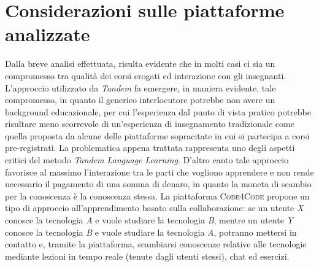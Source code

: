 \section{Considerazioni sulle piattaforme analizzate}
Dalla breve analisi effettuata, risulta evidente che in molti casi ci sia un compromesso tra qualità dei corsi erogati ed interazione con gli insegnanti. L'approccio utilizzato da \emph{Tandem} fa emergere, in maniera evidente, tale compromesso, in quanto il generico interlocutore potrebbe non avere un background educazionale, per cui l'esperienza dal punto di vista pratico potrebbe risultare meno scorrevole di un'esperienza di insegnamento tradizionale come quella proposta da alcune delle piattaforme sopracitate in cui si partecipa a corsi pre-registrati. La problematica appena trattata rappresenta uno degli aspetti critici del metodo \emph{Tandem Language Learning}. D'altro canto tale approccio favorisce al massimo l'interazione tra le parti che vogliono apprendere e non rende necessario il pagamento di una somma di denaro, in quanto la moneta di scambio per la conoscenza è la conoscenza stessa. La piattaforma \textsc{Code4Code} propone un tipo di approccio all'apprendimento basato sulla collaborazione: se un utente \emph{X} conosce la tecnologia \emph{A} e vuole studiare la tecnologia \emph{B}, mentre un utente \emph{Y} conosce la tecnologia \emph{B} e vuole studiare la tecnologia \emph{A}, potranno mettersi in contatto e, tramite la piattaforma, scambiarsi conoscenze relative alle tecnologie mediante lezioni in tempo reale (tenute dagli utenti stessi), chat ed esercizi. 